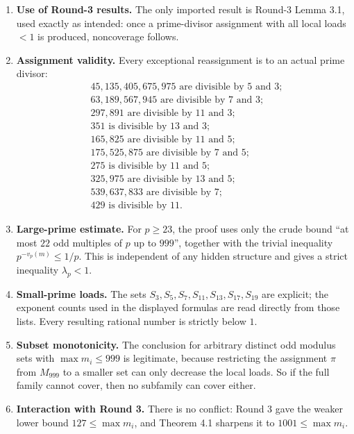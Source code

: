 \begin{enumerate}
\item \textbf{Use of Round-3 results.} The only imported result is Round-3 Lemma 3.1, used exactly as intended: once a prime-divisor assignment with all local loads \(<1\) is produced, noncoverage follows.

\item \textbf{Assignment validity.} Every exceptional reassignment is to an actual prime divisor:
\[
\begin{aligned}
&45,135,405,675,975 \text{ are divisible by }5\text{ and }3;\\
&63,189,567,945 \text{ are divisible by }7\text{ and }3;\\
&297,891 \text{ are divisible by }11\text{ and }3;\\
&351 \text{ is divisible by }13\text{ and }3;\\
&165,825 \text{ are divisible by }11\text{ and }5;\\
&175,525,875 \text{ are divisible by }7\text{ and }5;\\
&275 \text{ is divisible by }11\text{ and }5;\\
&325,975 \text{ are divisible by }13\text{ and }5;\\
&539,637,833 \text{ are divisible by }7;\\
&429 \text{ is divisible by }11.
\end{aligned}
\]

\item \textbf{Large-prime estimate.} For \(p\ge 23\), the proof uses only the crude bound ``at most \(22\) odd multiples of \(p\) up to \(999\)'', together with the trivial inequality \(p^{-v_p(m)}\le 1/p\). This is independent of any hidden structure and gives a strict inequality \(\lambda_p<1\).

\item \textbf{Small-prime loads.} The sets \(S_3,S_5,S_7,S_{11},S_{13},S_{17},S_{19}\) are explicit; the exponent counts used in the displayed formulas are read directly from those lists. Every resulting rational number is strictly below \(1\).

\item \textbf{Subset monotonicity.} The conclusion for arbitrary distinct odd modulus sets with \(\max m_i\le 999\) is legitimate, because restricting the assignment \(\pi\) from \(M_{999}\) to a smaller set can only decrease the local loads. So if the full family cannot cover, then no subfamily can cover either.

\item \textbf{Interaction with Round 3.} There is no conflict: Round 3 gave the weaker lower bound \(127\le \max m_i\), and Theorem 4.1 sharpens it to \(1001\le \max m_i\).
\end{enumerate}

